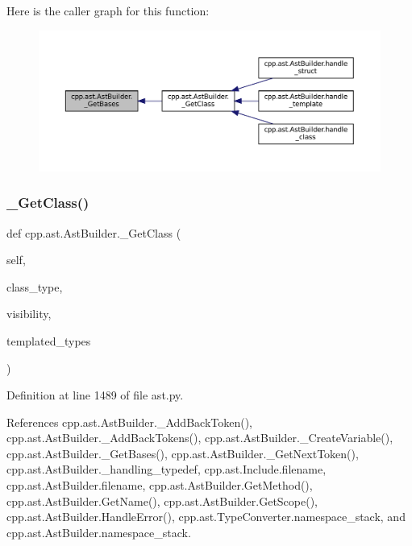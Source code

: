 Here is the caller graph for this function\+:
\nopagebreak
\begin{figure}[H]
\begin{center}
\leavevmode
\includegraphics[width=350pt]{classcpp_1_1ast_1_1AstBuilder_a5682851612e95587469f0c6d29d87e01_icgraph}
\end{center}
\end{figure}
\mbox{\label{classcpp_1_1ast_1_1AstBuilder_af5670e1181b5af00bce0acc0dd9d0da7}} 
\subsubsection{\texorpdfstring{\+\_\+\+Get\+Class()}{\_GetClass()}}
{\footnotesize\ttfamily def cpp.\+ast.\+Ast\+Builder.\+\_\+\+Get\+Class (\begin{DoxyParamCaption}\item[{}]{self,  }\item[{}]{class\+\_\+type,  }\item[{}]{visibility,  }\item[{}]{templated\+\_\+types }\end{DoxyParamCaption})\hspace{0.3cm}{\ttfamily [private]}}



Definition at line 1489 of file ast.\+py.



References cpp.\+ast.\+Ast\+Builder.\+\_\+\+Add\+Back\+Token(), cpp.\+ast.\+Ast\+Builder.\+\_\+\+Add\+Back\+Tokens(), cpp.\+ast.\+Ast\+Builder.\+\_\+\+Create\+Variable(), cpp.\+ast.\+Ast\+Builder.\+\_\+\+Get\+Bases(), cpp.\+ast.\+Ast\+Builder.\+\_\+\+Get\+Next\+Token(), cpp.\+ast.\+Ast\+Builder.\+\_\+handling\+\_\+typedef, cpp.\+ast.\+Include.\+filename, cpp.\+ast.\+Ast\+Builder.\+filename, cpp.\+ast.\+Ast\+Builder.\+Get\+Method(), cpp.\+ast.\+Ast\+Builder.\+Get\+Name(), cpp.\+ast.\+Ast\+Builder.\+Get\+Scope(), cpp.\+ast.\+Ast\+Builder.\+Handle\+Error(), cpp.\+ast.\+Type\+Converter.\+namespace\+\_\+stack, and cpp.\+ast.\+Ast\+Builder.\+namespace\+\_\+stack.




